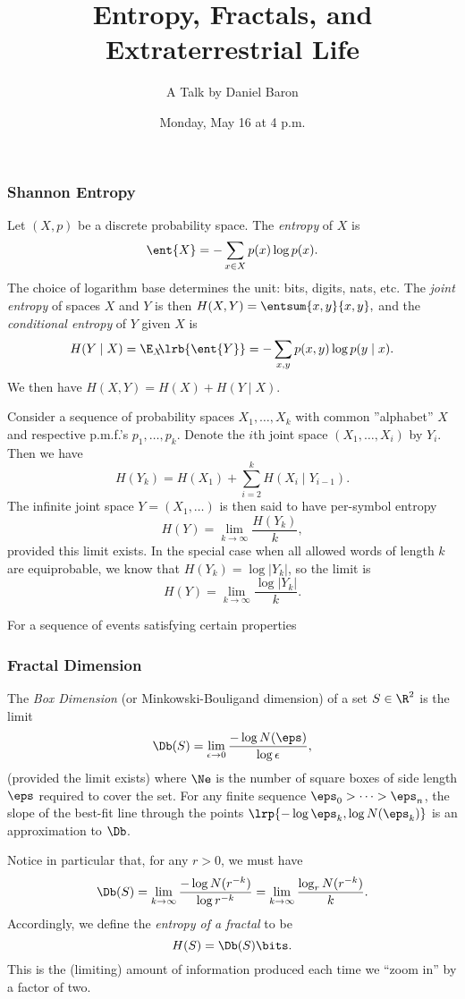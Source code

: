 \documentclass{article}
\title{Entropy, Fractals, and Extraterrestrial Life}
\author{A Talk by Daniel Baron}
\date{Monday, May 16 at 4 p.m.}
\begin{document}
\subsubsection*{Shannon Entropy}
Let $(X,p)$ be a discrete probability space. The \emph{entropy} of $X$ is
$$\ent{X}=-\sum_{x\in X}p(x)\log p(x).$$
The choice of logarithm base determines the unit: bits, digits, nats, etc. The \emph{joint entropy} of spaces $X$ and $Y$ is then $H(X,Y)=\entsum{x,y}{x,y},$ and the \emph{conditional entropy} of $Y$ given $X$ is 
$$H(Y\mid X)
=\E_X\!\!\lrb{\ent{Y}}
=-\sum_{x,y}p(x,y)\log p(y\mid x).$$
We then have $H(X,Y)=H(X)+H(Y\mid X)$.

Consider a sequence of probability spaces $X_1,\ldots,X_k$ with common ''alphabet'' $X$ and respective p.m.f.'s $p_1,\ldots,p_k$. Denote the $i$th joint space $(X_1,\ldots,X_i)$ by $Y_i$. Then we have
$$H(Y_k) = H(X_1)+\sum_{i=2}^kH(X_i\mid Y_{i-1}).$$
The infinite joint space $Y=(X_1,\ldots)$ is then said to have per-symbol entropy
$$H(Y) = \lim_{k\to\infty}\frac{H(Y_k)}{k},$$
provided this limit exists. In the special case when all allowed words of length $k$ are equiprobable, we know that $H(Y_k)=\log|Y_k|$, so the limit is
$$H(Y) = \lim_{k\to\infty}\frac{\log|Y_k|}{k}.$$ 
 
 
 
For a sequence of events satisfying certain properties

\subsubsection*{Fractal Dimension}

 The \emph{Box Dimension} (or Minkowski-Bouligand dimension) of a set $S\in\R^2$ is the limit
$$\Db(S)=\lim_{\epsilon\to0}\frac{-\log N(\eps)}{\log\epsilon},$$
(provided the limit exists) where $\Ne$ is the number of square boxes of side length $\eps$ required to cover the set. For any finite sequence $\eps_0>\cdots>\eps_n$, the slope of the best-fit line through the points $\lrp{-\log\eps_k,\log N(\eps_k)}$ is an approximation to $\Db$.

Notice in particular that, for any $r>0$, we must have
$$\Db(S)=\lim_{k\to\infty}\frac{-\log N(r^{-k})}{\log r^{-k}}
=\lim_{k\to\infty} \frac{\log_r N(r^{-k})}{k}.$$
Accordingly, we define the \emph{entropy of a fractal} to be 
$$H(S)=\Db(S) \bits.$$
This is the (limiting) amount of information produced each time we ``zoom in'' by a factor of two.
\end{document}
